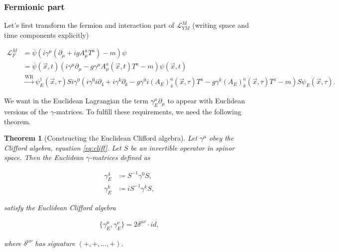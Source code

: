 \documentclass{article}
\theoremstyle{plain} %
\newtheorem{theorem}{Theorem}[section]
\theoremstyle{convention} %
\theoremstyle{remark} %
\numberwithin{equation}{section}
\begin{document}
\subsubsection{Fermionic part}

Let's first transform the fermion and interaction part of $\mathcal{L}_{YM}^M$ (writing space and time components explicitly)

\begin{align*}
    \mathcal{L}_{F}^M &= \overline{\psi} \left( i \gamma^{\mu} \left( \partial_{\mu} + ig A_{\mu}^a T^a \right)  - m \right) \psi \\
    &= \overline{\psi}(\vec{x},t) \left( i \gamma^{\mu} \partial_{\mu} - g \gamma^{\mu} A_{\mu}^a(\vec{x}, t) T^a - m \right) \psi(\vec{x},t) \\
    &\stackrel{\text{WR}}{\longrightarrow} \psi_E^{\dagger}(\vec{x},\tau) S i \gamma^0 \left( i \gamma^0 i \partial_4 + i \gamma^k \partial_k - g \gamma^0 i (A_E)_4^a(\vec{x}, \tau) T^a - g \gamma^k (A_E)_k^a(\vec{x}, \tau) T^a - m \right) S \psi_E(\vec{x},\tau).
\end{align*}

We want in the Euclidean Lagrangian the term $\gamma_E^{\mu} \partial_{\mu}$ to appear with Euclidean versions of the $\gamma$-matrices. To fulfill these requirements, we need the following theorem.

\begin{theorem}[Constructing the Euclidean Clifford algebra]

Let $\gamma^{\mu}$ obey the Clifford algebra, equation \eqref{eq:cliff}. Let $S$ be an invertible operator in spinor space. Then the Euclidean $\gamma$-matrices defined as 

\begin{align*}
    \gamma_E^4 &\coloneqq S^{-1} \gamma^0 S, \\
    \gamma_E^k &\coloneqq i S^{-1} \gamma^k S,
\end{align*}

satisfy the Euclidean Clifford algebra

\begin{align*}
    \{\gamma_E^{\mu}, \gamma_E^{\nu}\} = 2 \delta^{\mu \nu} \cdot id,
\end{align*}

where $\delta^{\mu \nu}$ has signature $(+, +, \dots, +)$.

\end{theorem}
\end{document}
